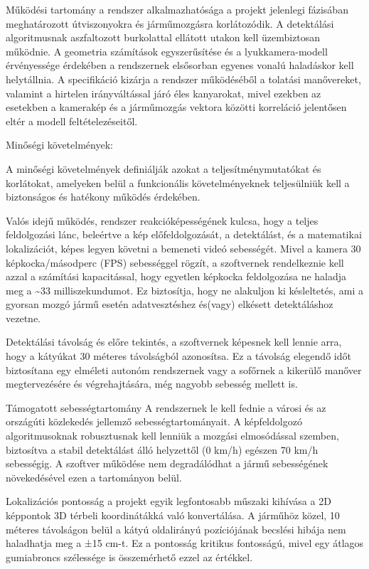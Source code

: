 Működési tartomány a rendszer alkalmazhatósága a projekt jelenlegi
fázisában meghatározott útviszonyokra és járműmozgásra korlátozódik. A
detektálási algoritmusnak aszfaltozott burkolattal ellátott utakon kell
üzembiztosan működnie. A geometria számítások egyszerűsítése és a
lyukkamera-modell érvényessége érdekében a rendszernek elsősorban
egyenes vonalú haladáskor kell helytállnia. A specifikáció kizárja a
rendszer működéséből a tolatási manővereket, valamint a hirtelen
irányváltással járó éles kanyarokat, mivel ezekben az esetekben a
kamerakép és a járműmozgás vektora közötti korreláció jelentősen eltér a
modell feltételezéseitől.

Minőségi követelmények:

A minőségi követelmények definiálják azokat a teljesítménymutatókat és
korlátokat, amelyeken belül a funkcionális követelményeknek teljesülniük
kell a biztonságos és hatékony működés érdekében.

Valós idejű működés, rendszer reakcióképességének kulcsa, hogy a teljes
feldolgozási lánc, beleértve a kép előfeldolgozását, a detektálást, és a
matematikai lokalizációt, képes legyen követni a bemeneti videó
sebességét. Mivel a kamera 30 képkocka/másodperc (FPS) sebességgel
rögzít, a szoftvernek rendelkeznie kell azzal a számítási kapacitással,
hogy egyetlen képkocka feldolgozása ne haladja meg a \textasciitilde33
milliszekundumot. Ez biztosítja, hogy ne alakuljon ki késleltetés, ami a
gyorsan mozgó jármű esetén adatvesztéshez és(vagy) elkésett
detektáláshoz vezetne.

Detektálási távolság és előre tekintés, a szoftvernek képesnek kell
lennie arra, hogy a kátyúkat 30 méteres távolságból azonosítsa. Ez a
távolság elegendő időt biztosítana egy elméleti autonóm rendszernek vagy
a sofőrnek a kikerülő manőver megtervezésére és végrehajtására, még
nagyobb sebesség mellett is.

Támogatott sebességtartomány A rendszernek le kell fednie a városi és az
országúti közlekedés jellemző sebességtartományait. A képfeldolgozó
algoritmusoknak robusztusnak kell lenniük a mozgási elmosódással
szemben, biztosítva a stabil detektálást álló helyzettől (0 km/h)
egészen 70 km/h sebességig. A szoftver működése nem degradálódhat a
jármű sebességének növekedésével ezen a tartományon belül.

Lokalizációs pontosság a projekt egyik legfontosabb műszaki kihívása a
2D képpontok 3D térbeli koordinátákká való konvertálása. A járműhöz
közel, 10 méteres távolságon belül a kátyú oldalirányú pozíciójának
becslési hibája nem haladhatja meg a ±15 cm-t. Ez a pontosság kritikus
fontosságú, mivel egy átlagos gumiabroncs szélessége is összemérhető
ezzel az értékkel.

